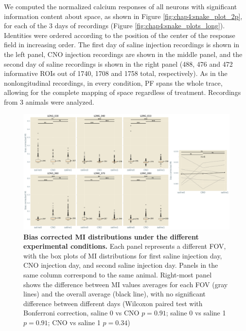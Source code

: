 We computed the normalized calcium responses of all neurons with significant information content about space, as shown in Figure \ref{fig:chap4:snake_plot_2p}, for each of the 3 days of recordings (Figure \ref{fig:chap4:snake_plots_long}). 
Identities were ordered according to the position of the center of the response field in increasing order.
The first day of saline injection recordings is shown in the left panel, CNO injection recordings are shown in the middle panel, and the second day of saline recordings is shown in the right panel (488, 476 and 472 informative  ROIs out of 1740, 1708 and 1758 total, respectively).
As in the nonlongitudinal recordings, in every condition, PF spans the whole trace, allowing for the complete mapping of space regardless of treatment.
Recordings from 3 animals were analyzed.
\begin{figure}[h]
    \centering
    \includegraphics[width=\textwidth]{Figures/Chapter4/MI_C_all_cells_longitudinal.pdf}
    \caption[Bias corrected MI distributions under the different experimental conditions]{\textbf{Bias corrected MI distributions under the different experimental conditions.} Each panel represents a different FOV, with the box plots of MI distributions for first saline injection day, CNO injection day, and second saline injection day. Panels in the same column correspond to the same animal. Right-most panel shows the difference between MI values averages for each FOV (gray lines) and the overall average (black line), with no significant difference between different days (Wilcoxon paired test with Bonferroni correction, saline 0 vs CNO $p=0.91$; saline 0 vs saline 1 $p=0.91$; CNO vs saline 1 $p=0.34$)}
    \label{fig:chap4:MI_C_all_cells_longitudinal}
\end{figure}

